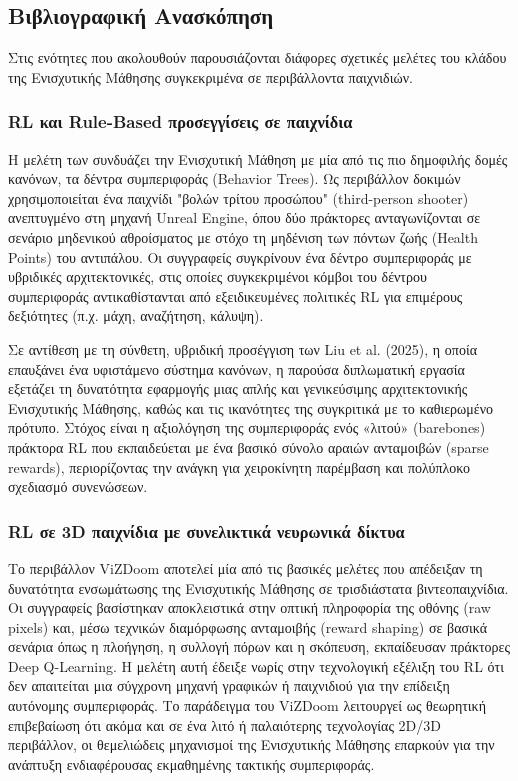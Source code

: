 \documentclass[12pt]{article}
\begin{document}
\subsection{Βιβλιογραφική Ανασκόπηση}
Στις ενότητες που ακολουθούν παρουσιάζονται διάφορες σχετικές μελέτες του κλάδου της Ενισχυτικής Μάθησης συγκεκριμένα σε περιβάλλοντα παιχνιδιών.
\subsubsection{RL και Rule-Based προσεγγίσεις σε παιχνίδια}
Η μελέτη των \cite{liu2025} συνδυάζει την Ενισχυτική Μάθηση με μία από τις πιο δημοφιλής δομές κανόνων, τα δέντρα συμπεριφοράς (Behavior Trees). Ως περιβάλλον δοκιμών χρησιμοποιείται ένα παιχνίδι "βολών τρίτου προσώπου" (third-person shooter) ανεπτυγμένο στη μηχανή Unreal Engine, όπου δύο πράκτορες ανταγωνίζονται σε σενάριο μηδενικού αθροίσματος με στόχο τη μηδένιση των πόντων ζωής (\foreignlanguage{english}{Health Points}) του αντιπάλου. Οι συγγραφείς συγκρίνουν ένα δέντρο συμπεριφοράς με υβριδικές αρχιτεκτονικές, στις οποίες συγκεκριμένοι κόμβοι του δέντρου συμπεριφοράς αντικαθίστανται από εξειδικευμένες πολιτικές RL για επιμέρους δεξιότητες (π.χ. μάχη, αναζήτηση, κάλυψη).

Σε αντίθεση με τη σύνθετη, υβριδική προσέγγιση των Liu et al. (2025), η οποία επαυξάνει ένα υφιστάμενο σύστημα κανόνων, η παρούσα διπλωματική εργασία εξετάζει τη δυνατότητα εφαρμογής μιας απλής και γενικεύσιμης αρχιτεκτονικής Ενισχυτικής Μάθησης, καθώς και τις ικανότητες της συγκριτικά με το καθιερωμένο πρότυπο. Στόχος είναι η αξιολόγηση της συμπεριφοράς ενός «λιτού» (barebones) πράκτορα RL που εκπαιδεύεται με ένα βασικό σύνολο αραιών ανταμοιβών (sparse rewards), περιορίζοντας την ανάγκη για χειροκίνητη παρέμβαση και πολύπλοκο σχεδιασμό συνενώσεων.

\subsubsection{RL σε 3D παιχνίδια με συνελικτικά νευρωνικά δίκτυα}
Το περιβάλλον ViZDoom \cite{kempka2016vizdoom} αποτελεί μία από τις βασικές μελέτες που απέδειξαν τη δυνατότητα ενσωμάτωσης της Ενισχυτικής Μάθησης σε τρισδιάστατα βιντεοπαιχνίδια. Οι συγγραφείς βασίστηκαν αποκλειστικά στην οπτική πληροφορία της οθόνης (raw pixels) και, μέσω τεχνικών διαμόρφωσης ανταμοιβής (reward shaping) σε βασικά σενάρια όπως η πλοήγηση, η συλλογή πόρων και η σκόπευση, εκπαίδευσαν πράκτορες Deep Q-Learning. Η μελέτη αυτή έδειξε νωρίς στην τεχνολογική εξέλιξη του RL ότι δεν απαιτείται μια σύγχρονη μηχανή γραφικών ή παιχνιδιού για την επίδειξη αυτόνομης συμπεριφοράς. Το παράδειγμα του ViZDoom λειτουργεί ως θεωρητική επιβεβαίωση ότι ακόμα και σε ένα λιτό ή παλαιότερης τεχνολογίας 2D/3D περιβάλλον, οι θεμελιώδεις μηχανισμοί της Ενισχυτικής Μάθησης επαρκούν για την ανάπτυξη ενδιαφέρουσας εκμαθημένης τακτικής συμπεριφοράς.
\end{document}
